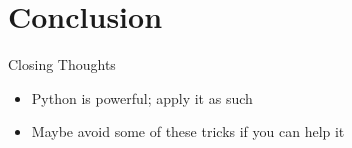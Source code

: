 \documentclass{beamer}
\begin{document}
\section{Conclusion}
\begin{frame}{Closing Thoughts}
\begin{itemize}
  \item Python is powerful; apply it as such
  \item Maybe avoid some of these tricks if you can help it
\end{itemize}
\end{frame}
\end{document}
